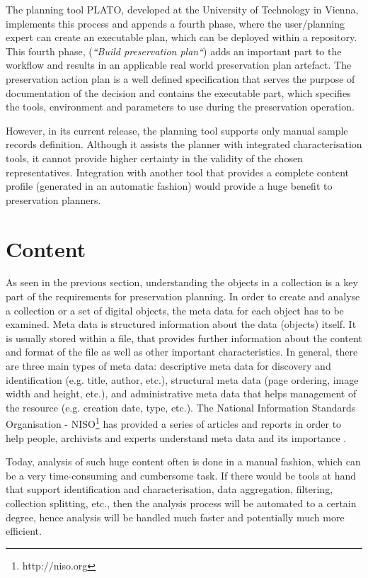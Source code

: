 The planning tool PLATO, developed at the University of Technology in Vienna, implements this process and appends a fourth phase, where the user/planning expert can create an executable plan, which can be deployed within a repository. 
This fourth phase, (\textit{``Build preservation plan``}) adds an important part to the workflow and results in an applicable real world preservation plan artefact. The preservation action plan is a well defined specification that serves the purpose of documentation of the decision and contains the executable part, which specifies the tools, environment and parameters to use during the preservation operation.

However, in its current release, the planning tool supports only manual sample records definition. Although it assists the planner with integrated characterisation tools, it cannot provide higher certainty in the validity of the chosen representatives. Integration with another tool that provides a complete content profile (generated in an automatic fashion) would provide a huge benefit to preservation planners.

\section{Content}
As seen in the previous section, understanding the objects in a collection is a key part of the requirements for preservation planning. In order to create and analyse a collection or a set of digital objects, the meta data for each object has to be examined. Meta data is structured information about the data (objects) itself. It is usually stored within a file, that provides further information about the content and format of the file as well as other important characteristics. In general, there are three main types of meta data: descriptive meta data for discovery and identification (e.g. title, author, etc.), structural meta data (page ordering, image width and height, etc.), and administrative meta data that helps management of the resource (e.g. creation date, type, etc.). The National Information Standards Organisation - NISO\footnote{http://niso.org} has provided a series of articles and reports in order to help people, archivists and experts understand meta data and its importance \cite{citeulike:6387279}.

Today, analysis of such huge content often is done in a manual fashion, which can be a very time-consuming and cumbersome task. If there would be tools at hand that support identification and characterisation, data aggregation, filtering, collection splitting, etc., then the analysis process will be automated to a certain degree, hence analysis will be handled much faster and potentially much more efficient. 

